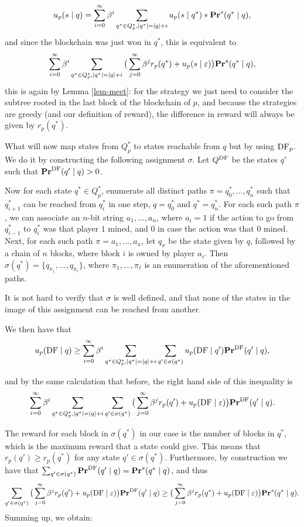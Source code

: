 $$u_p( s \mid q) = \sum_{i=0}^\infty \beta^i \sum_{q^* \in Q^*_p, |q^*| = |q| + i} u_p(s \mid q^*) * \mathbf{Pr}^s(q^* \mid q), $$
and since the blockchain was just won in $q^*$, %
this is equivalent to 
$$ \sum_{i=0}^\infty \beta^i \sum_{q^* \in Q^*_p, |q^*| = |q| + i} \big(\sum_{j = 0}^\infty \beta^j r_p(q^*) + u_p(s \mid \varepsilon) \big) \mathbf{Pr}^s(q^* \mid q), $$
this is again by Lemma \ref{lem-meet}: for the strategy we just need to consider the subtree rooted in the last block of the blockchain of $p$, and 
because the strategies are greedy (and our definition of reward), the difference in reward will always be given by $r_p(q^*)$. 

What will now map states from $Q^*_p$ to states reachable from $q$ but by using $\text{\rm DF}_p$. We do it by constructing the following assignment $\sigma$.
Let $Q^{\text{\rm DF}}$ be the states $q'$ such that $\mathbf{Pr}^{\text{\rm DF}}(q' \mid q) > 0$. 

Now for each state $q^* \in Q^*_p$, enumerate all distinct paths $\pi = q^*_0,\dots,q_n^*$ such that $q_{i+1}^*$ can be reached from 
$q_i^*$ in one step, $q = q_0^*$ and $q^* = q_n^*$. For each such path $\pi$, we can associate an $n$-bit string $a_1,\dots,a_n$, 
where $a_i = 1$ if the action to go from $q_{i-1}^*$ to $q_i^*$ was that player $1$ mined, and $0$ in case the action was that $0$ mined. 
Next, for each such path $\pi = a_1,\dots,a_n$, let $q_\pi$ be the state given by $q$, followed by a chain of $n$ blocks, where block $i$ is 
owned by player $a_i$. Then $\sigma(q^*) = \{q_{\pi_1},\dots,q_{\pi_\ell}\}$, where $\pi_1,\dots,\pi_\ell$ is an enumeration of the aforementioned paths. 

It is not hard to verify that $\sigma$ is well defined, and that none of 
the states in the image of this assignment can be reached from another. 

We then have that 
$$u_p( \text{\rm DF} \mid q) \geq \sum_{i=0}^\infty \beta^i \sum_{q^* \in Q^*_p, |q^*| = |q| + i} \sum_{q' \in \sigma(q^*)} 
u_p(\text{\rm DF} \mid q')  \mathbf{Pr}^{\text{\rm DF}}(q' \mid q), $$

and by the same calculation that before, the right hand side of this inequality is 
$$\sum_{i=0}^\infty \beta^i \sum_{q^* \in Q^*_p, |q^*| = |q| + i} \sum_{q' \in \sigma(q^*)}  \big(\sum_{j = 0}^\infty \beta^j r_p(q') + u_p(\text{\rm DF} \mid \varepsilon)\big) \mathbf{Pr}^{\text{\rm DF}}(q' \mid q).$$

The reward for each block in $\sigma(q^*)$ in our case is the number of blocks in $q^*$, which is the maximum reward that a state could give. This means that $r_p(q') \geq r_p(q^*)$ for any state $q' \in \sigma(q^*)$. 
Furthermore,  by construction we have that 
$\sum_{q' \in \sigma(q^*)} \mathbf{Pr}^{\text{\rm DF}}(q' \mid q) = \mathbf{Pr}^s(q^* \mid q)$, and thus 
$$\sum_{q' \in \sigma(q^*)} \big(\sum_{j = 0}^\infty \beta^j r_p(q') + u_p(\text{\rm DF} \mid \varepsilon)\big) \mathbf{Pr}^{\text{\rm DF}}(q' \mid q) \geq \big(\sum_{j = 0}^\infty \beta^j r_p(q^*) + u_p(\text{\rm DF} \mid \varepsilon)\big) \mathbf{Pr}^s(q^* \mid q).$$ 
Summing up, we obtain: 

